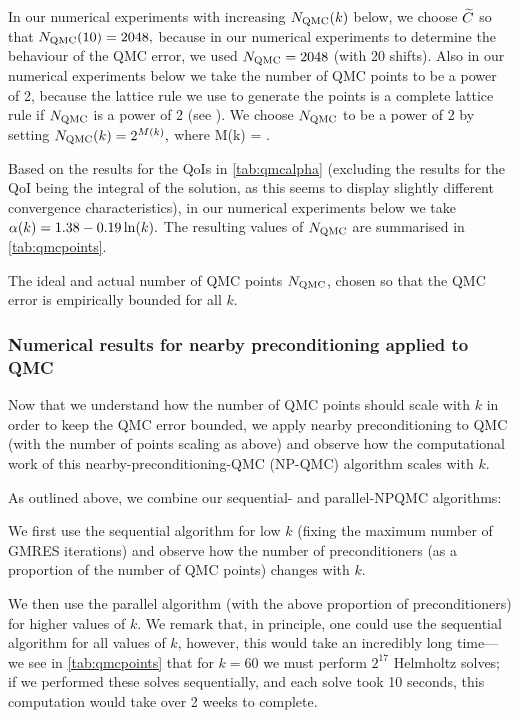 In our numerical experiments with increasing $N_{\mathrm{QMC}}(k)$ below, we choose $\widetilde{C}$ so that $N_{\mathrm{QMC}}(10) = 2048,$ because in our numerical experiments to determine the behaviour of the QMC error, we used $N_{\mathrm{QMC}} = 2048$ (with 20 shifts). Also in our numerical experiments below we take the number of QMC points to be a power of 2, because the lattice rule we use to generate the points is a complete lattice rule if $N_{\mathrm{QMC}}$ is a power of 2 (see \cite{NuREADME}). We choose $N_{\mathrm{QMC}}$ to be a power of 2 by setting $N_{\mathrm{QMC}}(k) = 2^{M(k)},$ where
\beqs
M(k) = .
\eeqs

Based on the results for the QoIs in \cref{tab:qmcalpha} (excluding the results for the QoI being the integral of the solution, as this seems to display slightly different convergence characteristics), in our numerical experiments below we take $\alpha(k) = 1.38 - 0.19  \operatorname{ln}(k).$ The resulting values of $N_{\mathrm{QMC}}$ are summarised in \cref{tab:qmcpoints}.

\begin{table}[h]
  \centering
  
  \caption{The ideal and actual number of QMC points $N_{\mathrm{QMC}}$, chosen so that the QMC error is empirically bounded for all $k$.}\label{tab:qmcpoints}
  \end{table}

\subsubsection{Numerical results for nearby preconditioning applied to QMC}

Now that we understand how the number of QMC points should scale with $k$ in order to keep the QMC error bounded, we apply nearby preconditioning to QMC (with the number of points scaling as above) and observe how the computational work of this nearby-preconditioning-QMC (NP-QMC) algorithm scales with $k.$

As outlined above, we combine our sequential- and parallel-NPQMC algorithms:
\bit
\item We first use the sequential algorithm for low $k$ (fixing the maximum number of GMRES iterations) and observe how the number of preconditioners (as a proportion of the number of QMC points) changes with $k$.
  \item We then use the parallel algorithm (with the above proportion of preconditioners) for higher values of $k.$
    \eit
    We remark that, in principle, one could use the sequential algorithm for all values of $k$, however, this would take an incredibly long time--- we see in \cref{tab:qmcpoints} that for $k=60$ we must perform $2^{17}$ Helmholtz solves; if we performed these solves sequentially, and each solve took 10 seconds, this computation would take over 2 weeks to complete.

